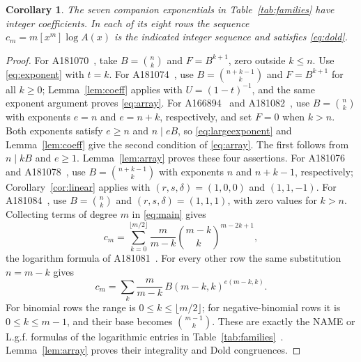 \documentclass[11pt]{article}
\newtheorem{corollary}[theorem]{Corollary}
\begin{document}
\begin{corollary}\label{cor:siblings}
The seven companion exponentials in Table~\ref{tab:families} have
integer coefficients. In each of its eight rows the sequence
$c_m=m[x^m]\log A(x)$ is the indicated integer sequence and satisfies
\eqref{eq:dold}.
\end{corollary}
\begin{proof}
For A181070~\cite{H70}, take $B=\binom nk$ and $F=B^{k+1}$,
zero outside $k\leq n$. Use \eqref{eq:exponent} with $t=k$.
For A181074~\cite{H74}, use $B=\binom{n+k-1}{k}$ and $F=B^{k+1}$
for all $k\geq0$; Lemma~\ref{lem:coeff} applies with $U=(1-t)^{-1}$,
and the same exponent argument proves \eqref{eq:array}.
For A166894~\cite{H894} and A181082~\cite{H82}, use $B=\binom nk$
with exponents $e=n$ and $e=n+k$, respectively, and set $F=0$ when $k>n$.
Both exponents satisfy $e\geq n$ and $n\mid eB$, so
\eqref{eq:largeexponent} and Lemma~\ref{lem:coeff} give the second
condition of \eqref{eq:array}. The first follows from $n\mid kB$ and $e\geq1$.
Lemma~\ref{lem:array} proves these four assertions.
For A181076 and A181078~\cite{H76,H78}, use
$B=\binom{n+k-1}{k}$ with exponents $n$ and $n+k-1$, respectively;
Corollary~\ref{cor:linear} applies with $(r,s,\delta)=(1,0,0)$
and $(1,1,-1)$. For A181084~\cite{H84}, use $B=\binom nk$
and $(r,s,\delta)=(1,1,1)$, with zero values for $k>n$.
Collecting terms of degree $m$ in \eqref{eq:main} gives
\begin{equation}\label{eq:ghost}
 c_m=\sum_{k=0}^{\lfloor m/2\rfloor}
       \frac{m}{m-k}\binom{m-k}{k}^{m-2k+1},
\end{equation}
the logarithm formula of A181081~\cite{H81}. For every other row the same
substitution $n=m-k$ gives
\[
 c_m=\sum_k\frac{m}{m-k}\,B(m-k,k)^{e(m-k,k)}.
\]
For binomial rows the range is $0\leq k\leq\lfloor m/2\rfloor$;
for negative-binomial rows it is $0\leq k\leq m-1$, and their base becomes
$\binom{m-1}{k}$. These are exactly the NAME or L.g.f. formulas of the
logarithmic entries in Table~\ref{tab:families}~\cite{Hlogs}.
Lemma~\ref{lem:array} proves their integrality and Dold congruences.
\end{proof}
\end{document}
